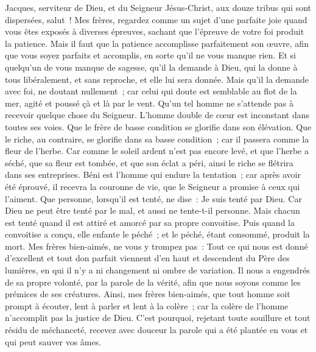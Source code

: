 \begin{multicols}{2}
\VerseOne{}Jacques, serviteur de Dieu, et du Seigneur Jésus-Christ, aux douze tribus qui sont dispersées, salut~!
Mes frères, regardez comme un sujet d'une parfaite joie quand vous êtes exposés à diverses épreuves,
sachant que l'épreuve de votre foi produit la patience.
Mais il faut que la patience accomplisse parfaitement son œuvre, afin que vous soyez parfaits et accomplis, en sorte qu'il ne vous manque rien.
Et si quelqu'un de vous manque de sagesse, qu'il la demande à Dieu, qui la donne à tous libéralement, et sans reproche, et elle lui sera donnée.
Mais qu'il la demande avec foi, ne doutant nullement~; car celui qui doute est semblable au flot de la mer, agité et poussé çà et là par le vent.
Qu'un tel homme ne s'attende pas à recevoir quelque chose du Seigneur.
L'homme double de cœur est inconstant dans toutes ses voies.
Que le frère de basse condition se glorifie dans son élévation.
Que le riche, au contraire, se glorifie dans sa basse condition~; car il passera comme la fleur de l'herbe.
Car comme le soleil ardent n'est pas encore levé, et que l'herbe a séché, que sa fleur est tombée, et que son éclat a péri, ainsi le riche se flétrira dans ses entreprises.
Béni est l'homme qui endure la tentation~; car après avoir été éprouvé, il recevra la couronne de vie, que le Seigneur a promise à ceux qui l'aiment.
Que personne, lorsqu'il est tenté, ne dise~: Je suis tenté par Dieu. Car Dieu ne peut être tenté par le mal, et aussi ne tente-t-il personne.
Mais chacun est tenté quand il est attiré et amorcé par sa propre convoitise.
Puis quand la convoitise a conçu, elle enfante le péché~; et le péché, étant consommé, produit la mort.
Mes frères bien-aimés, ne vous y trompez pas~:
Tout ce qui nous est donné d'excellent et tout don parfait viennent d'en haut et descendent du Père des lumières, en qui il n'y a ni changement ni ombre de variation.
Il nous a engendrés de sa propre volonté, par la parole de la vérité, afin que nous soyons comme les prémices de ses créatures.
Ainsi, mes frères bien-aimés, que tout homme soit prompt à écouter, lent à parler et lent à la colère~;
car la colère de l'homme n'accomplit pas la justice de Dieu.
C'est pourquoi, rejetant toute souillure et tout résidu de méchanceté, recevez avec douceur la parole qui a été plantée en vous et qui peut sauver vos âmes.

\end{multicols}
